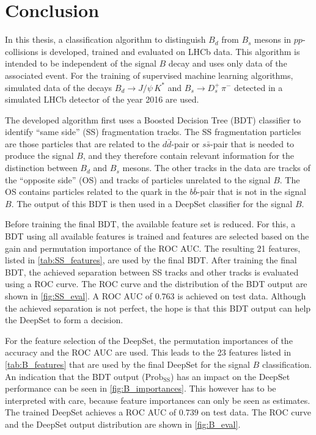 \chapter{Conclusion}

In this thesis, a classification algorithm to distinguish $B_d$ from $B_s$ mesons in $pp$-collisions is developed, trained and evaluated on LHCb data.
This algorithm is intended to be independent of the signal $B$ decay and uses only data of the associated event.
For the training of supervised machine learning algorithms, simulated data of the decays $B_d \rightarrow J/\psi \, K^*$ and $B_s \rightarrow D^+_s \, \pi^-$ detected in a simulated LHCb detector of the year 2016 are used.

The developed algorithm first uses a Boosted Decision Tree (BDT) classifier to identify \enquote{same side} (SS) fragmentation tracks.
The SS fragmentation particles are those particles that are related to the $d\bar{d}$-pair or $s\bar{s}$-pair that is needed to produce the signal $B$, and they therefore contain relevant information for the distinction between $B_d$ and $B_s$ mesons.
The other tracks in the data are tracks of the \enquote{opposite side} (OS) and tracks of particles unrelated to the signal $B$.
The OS contains particles related to the quark in the $b\bar{b}$-pair that is not in the signal $B$.
The output of this BDT is then used in a DeepSet classifier for the signal $B$.

Before training the final BDT, the available feature set is reduced.
For this, a BDT using all available features is trained and features are selected based on the gain and permutation importance of the ROC AUC. The resulting 21 features, listed in \autoref{tab:SS_features}, are used by the final BDT.
After training the final BDT, the achieved separation between SS tracks and other tracks is evaluated using a ROC curve.
The ROC curve and the distribution of the BDT output are shown in \autoref{fig:SS_eval}. A ROC AUC of $0.763$ is achieved on test data.
Although the achieved separation is not perfect, the hope is that this BDT output can help the DeepSet to form a decision.

For the feature selection of the DeepSet, the permutation importances of the accuracy and the ROC AUC are used.
This leads to the 23 features listed in \autoref{tab:B_features} that are used by the final DeepSet for the signal $B$ classification.
An indication that the BDT output ($\text{Prob}_\text{SS}$) has an impact on the DeepSet performance can be seen in \autoref{fig:B_importances}.
This however has to be interpreted with care, because feature importances can only be seen as estimates.
The trained DeepSet achieves a ROC AUC of $0.739$ on test data.
The ROC curve and the DeepSet output distribution are shown in \autoref{fig:B_eval}.

